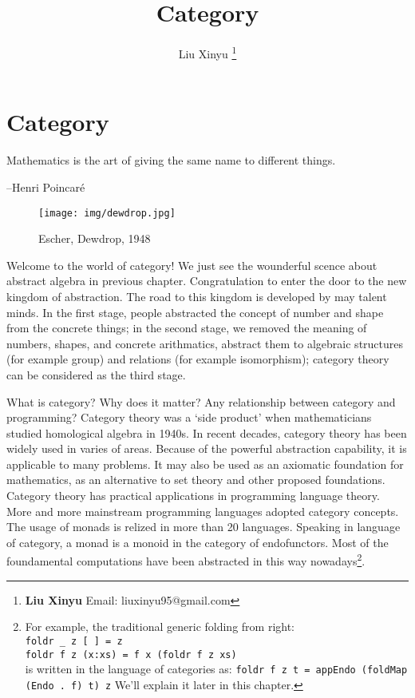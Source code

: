 \documentclass{article}
\begin{document}
\title{Category}

\author{Liu Xinyu
\thanks{{\bfseries Liu Xinyu} \newline
  Email: liuxinyu95@gmail.com \newline}
  }

\maketitle
\fi


\ifx\wholebook\relax
\chapter{Category}
\fi

\epigraph{Mathematics is the art of giving the same name to different things.}{--Henri Poincaré}


\begin{wrapfigure}{R}{0.4\textwidth}
 \centering
 \texttt{[image: img/dewdrop.jpg]}
 \captionsetup{labelformat=empty}
 \caption{Escher, Dewdrop, 1948}
 \label{fig:Escher-Dewdrop-1948}
\end{wrapfigure}

Welcome to the world of category! We just see the wounderful scence about abstract algebra in previous chapter. Congratulation to enter the door to the new kingdom of abstraction. The road to this kingdom is developed by may talent minds. In the first stage, people abstracted the concept of number and shape from the concrete things; in the second stage, we removed the meaning of numbers, shapes, and concrete arithmatics, abstract them to algebraic structures (for example group) and relations (for example isomorphism); category theory can be considered as the third stage.

What is category? Why does it matter? Any relationship between category and programming? Category theory was a `side product' when mathematicians studied homological algebra in 1940s. In recent decades, category theory has been widely used in varies of areas. Because of the powerful abstraction capability, it is applicable to many problems. It may also be used as an axiomatic foundation for mathematics, as an alternative to set theory and other proposed foundations. Category theory has practical applications in programming language theory. More and more mainstream programming languages adopted category concepts. The usage of monads is relized in more than 20 languages\cite{Monad-Haskell-Wiki}. Speaking in language of category, a monad is a monoid in the category of endofunctors. Most of the foundamental computations have been abstracted in this way nowadays\footnote{For example, the traditional generic folding from right: \\
\texttt{foldr \_ z {[} {]} = z} \\
\texttt{foldr f z (x:xs) = f x (foldr f z xs)} \\
is written in the language of categories as: \texttt{foldr f z t = appEndo (foldMap (Endo . f) t) z} We'll explain it later in this chapter.}.
\end{document}
